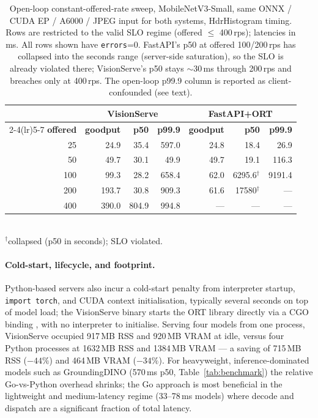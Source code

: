 \begin{table}[t]
  \centering
  \small
  \setlength{\tabcolsep}{3pt}
  \caption{%
    Open-loop constant-offered-rate sweep, MobileNetV3-Small, same ONNX / CUDA EP / A6000 /
    JPEG input for both systems, HdrHistogram timing.  Rows are restricted to the valid SLO
    regime (offered $\leq$ 400\,rps); latencies in ms.  All rows shown have
    \texttt{errors}=0.  FastAPI's p50 at offered 100/200\,rps has collapsed into the seconds
    range (server-side saturation), so the SLO is already violated there; VisionServe's p50
    stays $\sim$30\,ms through 200\,rps and breaches only at 400\,rps.  The open-loop p99.9
    column is reported as client-confounded (see text).%
  }
  \label{tab:openloop}
  \begin{tabular}{rrrrrrr}
    \toprule
    & \multicolumn{3}{c}{\textbf{VisionServe}} & \multicolumn{3}{c}{\textbf{FastAPI+ORT}} \\
    \cmidrule(lr){2-4}\cmidrule(lr){5-7}
    \textbf{offered} & \textbf{goodput} & \textbf{p50} & \textbf{p99.9}
      & \textbf{goodput} & \textbf{p50} & \textbf{p99.9} \\
    \midrule
    25  & 24.9  & 35.4  & 597.0 & 24.8 & 18.4               & 26.9 \\
    50  & 49.7  & 30.1  & 49.9  & 49.7 & 19.1               & 116.3 \\
    100 & 99.3  & 28.2  & 658.4 & 62.0 & 6295.6$^{\dagger}$ & 9191.4 \\
    200 & 193.7 & 30.8  & 909.3 & 61.6 & 17580$^{\dagger}$  & --- \\
    400 & 390.0 & 804.9 & 994.8 & ---  & ---                & --- \\
    \bottomrule
  \end{tabular}
  \\[2pt]
  {\footnotesize $^{\dagger}$collapsed (p50 in seconds); SLO violated.}
\end{table}

\paragraph{Cold-start, lifecycle, and footprint.}
Python-based servers also incur a cold-start penalty from interpreter startup,
\texttt{import torch}, and CUDA context initialisation, typically several seconds on top of
model load; the VisionServe binary starts the ORT library directly via a CGO binding
\cite{onnxruntime}, with no interpreter to initialise.  Serving four models from one
process, VisionServe occupied 917\,MB RSS and 920\,MB VRAM at idle, versus four Python
processes at 1632\,MB RSS and 1384\,MB VRAM — a saving of 715\,MB RSS ($-44\%$) and 464\,MB
VRAM ($-34\%$).  For heavyweight, inference-dominated models such as GroundingDINO
(570\,ms p50, Table~\ref{tab:benchmark}) the relative Go-vs-Python overhead shrinks; the Go
approach is most beneficial in the lightweight and medium-latency regime (33--78\,ms models)
where decode and dispatch are a significant fraction of total latency.

